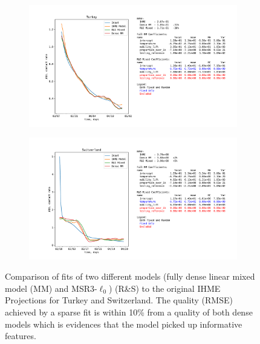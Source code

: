 \begin{figure}
	\begin{subfigure}[b]{\textwidth}
		\includegraphics[width=\textwidth]{figures/fit_Turkey}
	\end{subfigure}
	\begin{subfigure}[b]{\textwidth}
		\includegraphics[width=\textwidth]{figures/fit_Switzerland}	
	\end{subfigure}
	\caption{\label{fig:covid_feature_selection_2} Comparison of fits of two different models (fully dense linear mixed model (MM) and MSR3-$\ell_0$) (R\&S) to the original IHME Projections for Turkey and Switzerland. The quality (RMSE) achieved by a sparse fit is within 10\% from a quality of both dense models which is evidences that the model picked up informative features.}
\end{figure}

